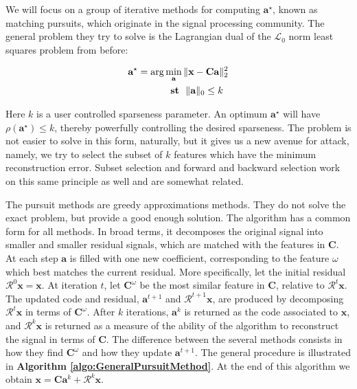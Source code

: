 \documentclass[12pt,a4paper,oneside,english]{UPBThesis}
\begin{document}
We will focus on a group of iterative methods for computing $\textbf{a}^\star$, known as matching pursuits, which originate in the signal processing community. The general problem they try to solve is the Lagrangian dual of the $\mathcal{L}_0$ norm least squares problem from before:

\begin{align*}
\textbf{a}^\star = \arg & \min_\textbf{a} \|\textbf{x} - \textbf{C}\textbf{a}\|_2^2 \\
& \text{~~\textbf{st}~~} \|\textbf{a}\|_0 \leq k
\end{align*}

Here $k$ is a user controlled sparseness parameter. An optimum $\textbf{a}^\star$ will have $\rho(\textbf{a}^\star) \leq k$, thereby powerfully controlling the desired sparseness. The problem is not easier to solve in this form, naturally, but it gives us a new avenue for attack, namely, we try to select the subset of $k$ features which have the minimum reconstruction error. Subset selection and forward and backward selection work on this same principle as well and are somewhat related.

The pursuit methods are greedy approximations methods. They do not solve the exact problem, but provide a good enough solution. The algorithm has a common form for all methods. In broad terms, it decomposes the original signal into smaller and smaller residual signals, which are matched with the features in $\textbf{C}$. At each step $\textbf{a}$ is filled with one new coefficient, corresponding to the feature $\omega$ which best matches the current residual. More specifically, let the initial residual $\mathcal{R}^0\textbf{x} = \textbf{x}$. At iteration $t$, let $\textbf{C}^\omega$ be the most similar feature in $\textbf{C}$, relative to $\mathcal{R}^t\textbf{x}$. The updated code and residual, $\textbf{a}^{t+1}$ and $\mathcal{R}^{t+1}\textbf{x}$, are produced by decomposing $\mathcal{R}^t\textbf{x}$ in terms of $\textbf{C}^\omega$. After $k$ iterations, $\textbf{a}^k$ is returned as the code associated to $\textbf{x}$, and $\mathcal{R}^k\textbf{x}$ is returned as a measure of the ability of the algorithm to reconstruct the signal in terms of $\textbf{C}$. The difference between the several methods consists in how they find $\textbf{C}^\omega$ and how they update $\textbf{a}^{t+1}$. The general procedure is illustrated in \textbf{Algorithm \ref{algo:GeneralPursuitMethod}}. At the end of this algorithm we obtain $\textbf{x} = \textbf{C}\textbf{a}^k + \mathcal{R}^k\textbf{x}$.
\end{document}

